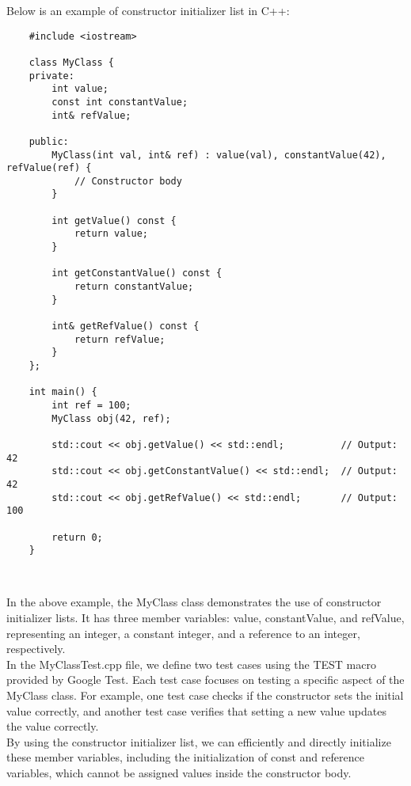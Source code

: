 \begin{solution}
    Below is an example of constructor initializer list in C++: \\
    \horizontalline
    \begin{verbatim}
    #include <iostream>

    class MyClass {
    private:
        int value;
        const int constantValue;
        int& refValue;
    
    public:
        MyClass(int val, int& ref) : value(val), constantValue(42), refValue(ref) {
            // Constructor body
        }
    
        int getValue() const {
            return value;
        }
    
        int getConstantValue() const {
            return constantValue;
        }
    
        int& getRefValue() const {
            return refValue;
        }
    };
    
    int main() {
        int ref = 100;
        MyClass obj(42, ref);
    
        std::cout << obj.getValue() << std::endl;          // Output: 42
        std::cout << obj.getConstantValue() << std::endl;  // Output: 42
        std::cout << obj.getRefValue() << std::endl;       // Output: 100
    
        return 0;
    }
    \end{verbatim} \\
    \horizontalline

    In the above example, the MyClass class demonstrates the use of constructor initializer lists. It has three member variables: value, constantValue, and refValue, representing an integer, a constant integer, and a reference to an integer, respectively. \\

    \noindent In the MyClassTest.cpp file, we define two test cases using the TEST macro provided by Google Test. Each test case focuses on testing a specific aspect of the MyClass class. For example, one test case checks if the constructor sets the initial value correctly, and another test case 
    verifies that setting a new value updates the value correctly. \\

    \noindent By using the constructor initializer list, we can efficiently and directly initialize these member variables, including the initialization of const and reference variables, which cannot be assigned values inside the constructor body. \\


\end{solution}
